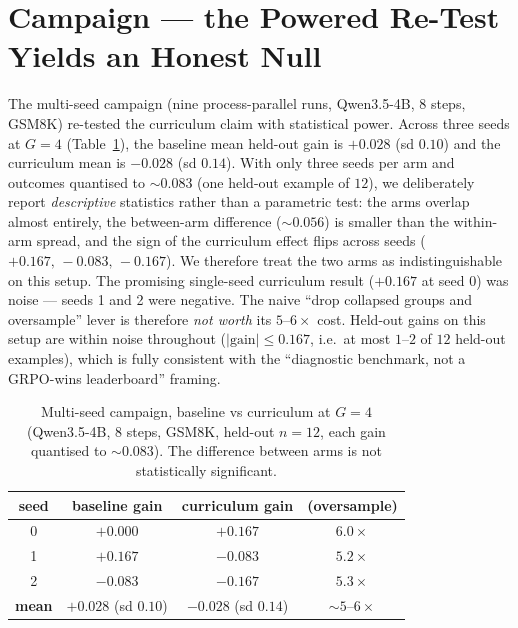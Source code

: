 \documentclass[12pt,a4paper]{report}
\begin{document}
\section{Campaign --- the Powered Re-Test Yields an Honest Null}
\label{sec:campaign}

The multi-seed campaign (nine process-parallel runs, Qwen3.5-4B, 8 steps, GSM8K)
re-tested the curriculum claim with statistical power. Across three seeds at $G{=}4$
(Table~\ref{tab:campaign}), the baseline mean held-out gain is $+0.028$ (sd $0.10$)
and the curriculum mean is $-0.028$ (sd $0.14$). With only three seeds per arm and
outcomes quantised to ${\sim}0.083$ (one held-out example of $12$), we deliberately
report \emph{descriptive} statistics rather than a parametric test: the arms overlap
almost entirely, the between-arm difference (${\sim}0.056$) is smaller than the
within-arm spread, and the sign of the curriculum effect flips across seeds
($+0.167,\,-0.083,\,-0.167$). We therefore treat the two arms as indistinguishable
on this setup. The promising single-seed
curriculum result ($+0.167$ at seed 0) was noise --- seeds 1 and 2 were negative. The
naive ``drop collapsed groups and oversample'' lever is therefore \emph{not worth}
its $5$--$6\times$ cost. Held-out gains on this setup are within noise throughout
($|\text{gain}|\le0.167$, i.e.\ at most $1$--$2$ of $12$ held-out examples), which is
fully consistent with the ``diagnostic benchmark, not a GRPO-wins leaderboard''
framing.

\begin{table}[t]
\centering
\small
\begin{tabular}{@{}cccc@{}}
\toprule
seed & baseline gain & curriculum gain & (oversample) \\
\midrule
0 & $+0.000$ & $+0.167$ & $6.0\times$ \\
1 & $+0.167$ & $-0.083$ & $5.2\times$ \\
2 & $-0.083$ & $-0.167$ & $5.3\times$ \\
\midrule
\textbf{mean} & $\mathbf{+0.028}$ (sd $0.10$) & $\mathbf{-0.028}$ (sd $0.14$) & ${\sim}5$--$6\times$ \\
\bottomrule
\end{tabular}
\caption{Multi-seed campaign, baseline vs curriculum at $G{=}4$ (Qwen3.5-4B, 8 steps,
GSM8K, held-out $n=12$, each gain quantised to ${\sim}0.083$). The difference between
arms is not statistically significant.}
\label{tab:campaign}
\end{table}
\end{document}
